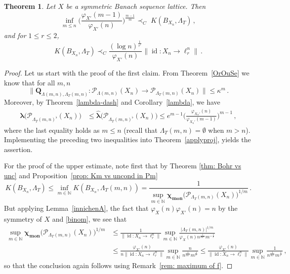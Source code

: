 \documentclass[12pt]{amsart}
\numberwithin{subsection}{section}
\newtheorem{theorem}{Theorem}[section]
\theoremstyle{definition}
\theoremstyle{remark}
\DeclareMathOperator{\mon}{mon}
\DeclareMathOperator{\id}{\mathrm{id}}
\newcommand{\chimon}{\chi_{\mon}}
\begin{document}
\begin{theorem} \label{applyhedral}
Let $X$ be a symmetric Banach sequence lattice. Then
\[
\inf_{m\leq n} \bigg(\frac{\varphi_{X'}(m-1)}{\varphi_{X'}(n)}\bigg)^{\frac{m-1}{m}}
\prec_C\,\, K(B_{X_n},\Lambda_T)\,,
\]
and for  $1 \leq r \leq 2$,
\[
K(B_{X_n},\Lambda_T) \prec_C
\frac{(\log n)^{\frac{1}{r'}}}{\varphi_{X'}(n)}\|\id\colon X_n \to \ell_r^n\|\,.
\]
\end{theorem}

\begin{proof}
Let us start with the proof of the first claim. From Theorem~\ref{OrOuSe} we know that for all $m,n$
\[
\big\|\mathbf{Q}_{\Lambda(m,n),\Lambda_T(m,n)}:
\mathcal{P}_{\Lambda(m,n)}(X_n) \to \mathcal{P}_{\Lambda_T(m,n)}(X_n)\big\|
\leq \kappa^m\,.
\]
Moreover, by Theorem~\ref{lambda-dash} and Corollary~\ref{lambda}, we have
\begin{align*}
\boldsymbol{\lambda}\big(\mathcal{P}_{\Lambda_T(m,n)^\flat}(X_n)\big)
& \le \widehat{\boldsymbol{\lambda}}\big(\mathcal{P}_{\Lambda_T(m,n)^\flat}(X_n)\big)
\le e^{m-1} \Big(\frac{\varphi_{X_n'}(n)}{\varphi_{X_n'}(m-1)}\Big)^{m-1}\,,
\end{align*}
where the last equality holds as $m \le n$ (recall that $\Lambda_T(m,n) = \emptyset$ when $m > n$).
Implementing the preceding two inequalities into Theorem~\ref{applyproj}, yields the assertion.

For the proof of the upper estimate, note first that by Theorem \ref{thm: Bohr vs unc} and Proposition~\ref{prop: Km vs uncond in Pm}
\[
K(B_{X_n},\Lambda_T) \leq  \inf_{ m \in \mathbb{N} } K(B_{X_n},\Lambda_T(m,n))
= \frac{1}{\sup_{ m \in \mathbb{N} } \boldsymbol{\chimon}\big(\mathcal{P}_{\Lambda_T(m,n)}(X_n)\big)^{1/m}}\,.
\]
But applying Lemma~\ref{innichenA}, the fact that $\varphi_X(n)\varphi_{X'}(n)=n$ by the symmetry of $X$ and
\eqref{binom}, we see that
\begin{align*}
\sup_{ m \in \mathbb{N} } \boldsymbol{\chimon}\big(\mathcal{P}_{\Lambda_T(m,n)}(X_n)\big)^{1/m}
&
\le  \frac{1}{\|\id \colon X_n\to \ell_r^n\|}\sup_{ m \in \mathbb{N}}\frac{|\Lambda_T(m,n)|^{1/m}}{\varphi_X(n) n^{\frac{1}{mr'}} m ^{-\frac{1}{r}}} \\
&
\le  \frac{\varphi_{X'}(n) }{ n \|\id \colon X_n\to \ell_r^n\|}\sup_{m \in \mathbb{N} }\frac{  n}{n^{\frac{1}{mr'}} m ^{\frac{1}{r'}}}
\le \frac{\varphi_{X'}(n) }{ \|\id \colon X_n\to \ell_r^n\|}\sup_{ m \in \mathbb{N} }\frac{1}{n^{\frac{1}{mr'}} m ^{\frac{1}{r'}}}\,,
\end{align*}
so that the conclusion again follows using Remark~\ref{rem: maximum of f}.
\end{proof}
\end{document}

